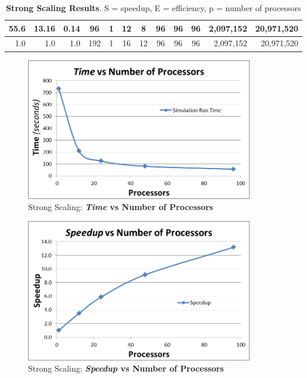 \documentclass[]{article}
\begin{document}
\begin{table}[h!]
\begin{tabular}{|r|r|r|c|c|c|c|c|c|c|r|r|}
55.6                                                  & 13.16                                              & 0.14                                              & 96                          & 1           & 12          & 8           & 96           & 96           & 96          & 2,097,152                                                & 20,971,520                                                   \\ \hline
1.0                                                  & 1.0                                              & 1.0                                              & 192                         & 1           & 16          & 12          & 96           & 96           & 96          & 2,097,152                                                & 20,971,520                                                   \\ \hline
\end{tabular}
\caption{\textbf{Strong Scaling Results}. S = speedup, E = efficiency, p = number of processors}
\end{table}


\begin{figure}[h!]
    \centering
    \includegraphics[width=10cm]{strong_times.png}
    \caption{Strong Scaling: \textbf{\textit{Time} vs Number of Processors}}
\end{figure}

\begin{figure}[h!]
    \centering
    \includegraphics[width=10cm]{strong_speedup.png}
    \caption{Strong Scaling: \textbf{\textit{Speedup} vs Number of Processors}}
\end{figure}
\end{document}
